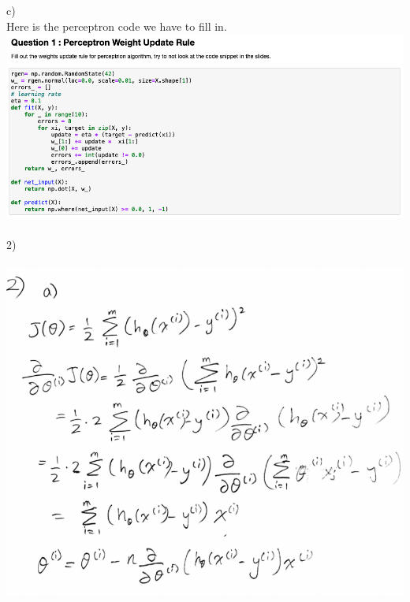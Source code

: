 \documentclass[11pt]{article}
\begin{document}
c) \\
Here is the perceptron code we have to fill in. \\
\includegraphics[scale=0.4]{perceptron}
\\
\\
2) \\
\\
\includegraphics[scale=0.32]{adaline}
\end{document}
